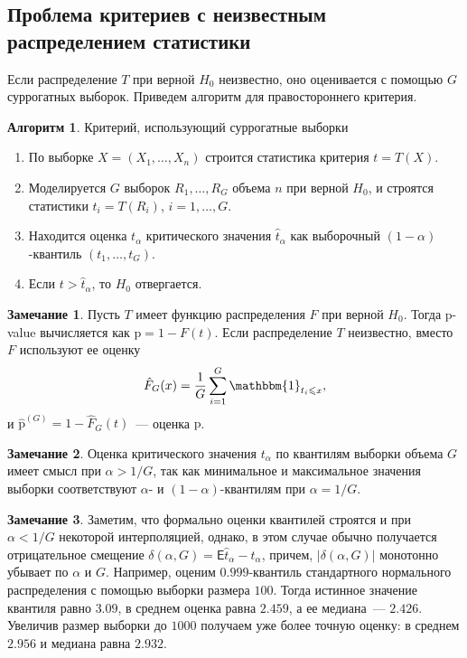 \documentclass[specialist,
substylefile = spbu.rtx,
               subf,href,colorlinks=true, 12pt]{disser}
\theoremstyle{definition}
\newtheorem{algorithm}{Алгоритм}
\newtheorem{remark}{Замечание}
\begin{document}
\subsection{Проблема критериев с неизвестным распределением статистики}\label{sect:problem}
Если распределение $T$ при верной $H_0$ неизвестно, оно оценивается с помощью $G$ суррогатных выборок. Приведем алгоритм для правостороннего критерия.

\begin{algorithm}{Критерий, использующий суррогатные выборки}\label{alg:surrogate}
	\begin{enumerate}
		\item По выборке $X=(X_1,\ldots, X_n)$ строится статистика критерия $t=T(X)$.
		\item Моделируется $G$ выборок $R_1,\ldots, R_G$ объема $n$ при верной $H_0$, и строятся статистики $t_i=T(R_i)$, $i=1,\ldots, G$.
		\item Находится оценка $t_\alpha$ критического значения $\hat t_\alpha$ как выборочный $(1-\alpha)$-квантиль $(t_1,\ldots,t_G)$.
		\item Если $t>\hat t_\alpha$, то $H_0$ отвергается.
	\end{enumerate}
\end{algorithm}

\begin{remark}
	Пусть $T$ имеет функцию распределения $F$ при верной $H_0$. Тогда p-value вычисляется как $\mathrm p= 1-F(t)$. Если распределение $T$ неизвестно, вместо $F$ используют ее оценку
	\[
		\hat F_G(x)=\frac{1}G\sum_{i=1}^G \mathbbm{1}_{t_i\leqslant x},
	\]
	и $\hat {\mathrm p}^{(G)} = 1 - \hat F_G(t)$~--- оценка $\mathrm p$.
\end{remark}

\begin{remark}\label{rem:assumption1}
	Оценка критического значения $t_\alpha$ по квантилям выборки объема $G$ имеет смысл при $\alpha>1/G$, так как минимальное и максимальное значения выборки соответствуют $\alpha$- и $(1-\alpha)$-квантилям при $\alpha = 1/G$.
\end{remark}

\begin{remark}
Заметим, что формально оценки квантилей строятся и при $\alpha < 1/G$ некоторой интерполяцией, однако, в этом случае обычно получается отрицательное смещение $\delta(\alpha,G)=\mathsf E\hat t_\alpha - t_\alpha$, причем, $|\delta(\alpha, G)|$ монотонно убывает по $\alpha$ и $G$.
	Например, оценим $0.999$-квантиль стандартного нормального распределения с помощью выборки размера $100$. Тогда истинное значение квантиля равно $3.09$, в среднем оценка равна $2.459$, а ее медиана~--- $2.426$. Увеличив размер выборки до $1000$ получаем уже более точную оценку: в среднем $2.956$ и медиана равна $2.932$.
\end{remark}
\end{document}
